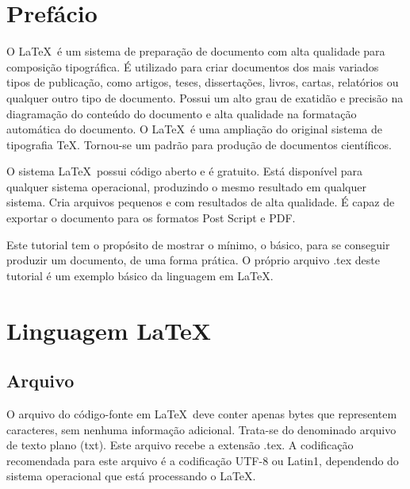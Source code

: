 \documentclass[a4paper,12pt,oneside]{book}
\begin{document}
\tableofcontents

\mainmatter


\setlength{\parskip}{1em}

\chapter*{Prefácio}

O \LaTeX\ é um sistema de preparação de documento com alta qualidade para composição tipográfica. É utilizado para criar documentos dos mais variados tipos de publicação, como artigos, teses, dissertações, livros, cartas, relatórios ou qualquer outro tipo de documento. Possui um alto grau de exatidão e precisão na diagramação do conteúdo do documento e alta qualidade na formatação automática do documento. O \LaTeX\ é uma ampliação do original sistema de tipografia \TeX. Tornou-se um padrão para produção de documentos científicos.

O sistema \LaTeX\ possui código aberto e é gratuito. Está disponível para qualquer sistema operacional, produzindo o mesmo resultado em qualquer sistema. Cria arquivos pequenos e com resultados de alta qualidade. É capaz de exportar o documento para os formatos Post Script e PDF.

Este tutorial tem o propósito de mostrar o mínimo, o básico, para se conseguir produzir um documento, de uma forma prática. O próprio arquivo .tex deste tutorial é um exemplo básico da linguagem em \LaTeX.

\chapter*{Linguagem \LaTeX}

\section*{Arquivo}

O arquivo do código-fonte em \LaTeX\ deve conter apenas bytes que representem caracteres, sem nenhuma informação adicional. Trata-se do denominado arquivo de texto plano (txt). Este arquivo recebe a extensão .tex. A codificação recomendada para este arquivo é a codificação UTF-8 ou Latin1, dependendo do sistema operacional que está processando o \LaTeX.
\end{document}
